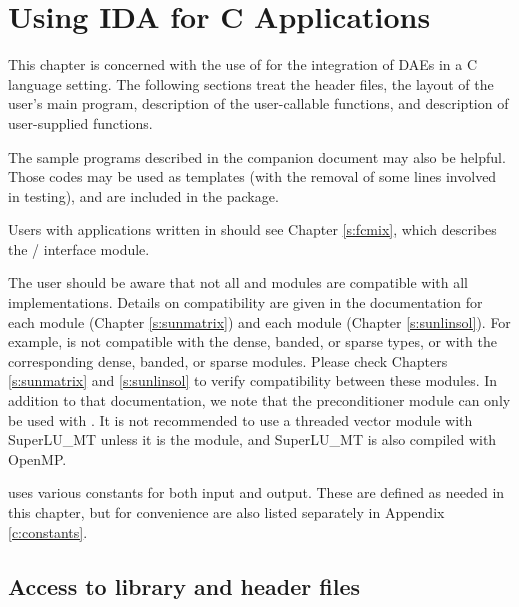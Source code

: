\chapter{Using IDA for C Applications}\label{s:simulation}

This chapter is concerned with the use of {\ida} for the integration
of DAEs in a C language setting.  The following sections treat the header files,
the layout of the user's main program, description of the {\ida} user-callable
functions, and description of user-supplied functions.

The sample programs described in the companion document \cite{ida_ex}
may also be helpful. Those codes may be used as templates (with the removal of
some lines involved in testing), and are included in the {\ida} package.

Users with applications written in {\F} should see Chapter \ref{s:fcmix},
which describes the {\F}/{\CC} interface module.

The user should be aware that not all {\sunlinsol} and {\sunmatrix}
modules are compatible with all {\nvector} implementations.
Details on compatibility are given in the documentation for each
{\sunmatrix} module (Chapter \ref{s:sunmatrix}) and each {\sunlinsol}
module (Chapter \ref{s:sunlinsol}). For example, {\nvecp} is not
compatible with the dense, banded, or sparse {\sunmatrix} types, or with
the corresponding dense, banded, or sparse {\sunlinsol} modules.  Please
check Chapters \ref{s:sunmatrix} and \ref{s:sunlinsol} to verify
compatibility between these modules.  In addition to that
documentation, we note that the preconditioner module {\idabbdpre}
can only be used with {\nvecp}.
It is not recommended to use a threaded vector module with SuperLU\_MT
unless it is the {\nvecopenmp} module, and SuperLU\_MT is also compiled
with OpenMP.

{\ida} uses various constants for both input and output.  These are
defined as needed in this chapter, but for convenience are also listed
separately in Appendix \ref{c:constants}.

\section{Access to library and header files}\label{ss:file_access}

